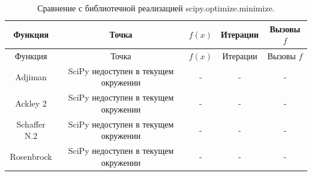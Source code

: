 \begin{longtable}{|c|c|c|c|c|}
\caption{Сравнение с библиотечной реализацией scipy.optimize.minimize.}\label{tab:scipy}\\
\hline
Функция & Точка & $f(x)$ & Итерации & Вызовы $f$ \\
\hline
\endfirsthead
\hline
Функция & Точка & $f(x)$ & Итерации & Вызовы $f$ \\
\hline
\endhead
Adjiman & SciPy недоступен в текущем окружении & - & - & - \\
Ackley 2 & SciPy недоступен в текущем окружении & - & - & - \\
Schaffer N.2 & SciPy недоступен в текущем окружении & - & - & - \\
Rosenbrock & SciPy недоступен в текущем окружении & - & - & - \\
\hline
\end{longtable}
